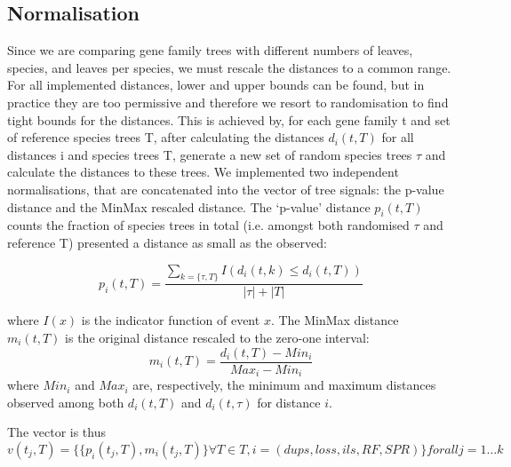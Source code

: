 \subsection{Normalisation}
Since we are comparing gene family trees with different numbers of leaves, species, and leaves per species, we must
rescale the distances to a common range. For all implemented distances, lower and upper bounds can be found, but in
practice they are too permissive and therefore we resort to randomisation to find tight bounds for the distances. This
is achieved by, for each gene family t and set of reference species trees T, after calculating the distances $d_i(t, T)$
for all distances i and species trees T, generate a new set of random species trees $\tau$ and calculate the distances to
these trees. We implemented two independent normalisations, that are concatenated into the vector of tree signals: the
p-value distance and the MinMax rescaled distance. The ‘p-value’ distance $p_i(t,T)$ counts the fraction of species trees
in total (i.e. amongst both randomised $\tau$ and reference T) presented a distance as small as the observed:

\begin{equation}
p_i(t,T)=\frac{ \sum_{k=\{\tau,T\} } I(d_i(t,k)\leq d_i(t,T))}{|\tau| + |T|}
\end{equation}

where $I(x)$ is the indicator function of event $x$.
The MinMax distance $m_i(t,T)$ is the original distance rescaled to the zero-one interval:
\begin{equation}
m_i(t,T) = \frac{d_i(t,T) - Min_i}{Max_i - Min_i}
\end{equation}
where $Min_i$ and $Max_i$ are, respectively, the minimum and maximum distances observed among both $d_i(t,T)$ and
$d_i(t,\tau)$ for distance $i$.

The vector is thus
\begin{equation}
v(t_j,T) = \{\{p_i(t_j, T), m_i(t_j,T)\}  \forall T\in T, i=\left(dups, loss, ils, RF, SPR\right) \} forall j=1\dots k
\end{equation}

